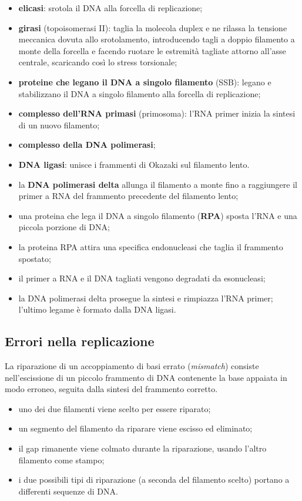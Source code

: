 \begin{itemize}
  \item \textbf{elicasi}: srotola il DNA alla forcella di replicazione;
  \item \textbf{girasi} (topoisomerasi II): taglia la molecola duplex e ne rilassa la tensione meccanica dovuta allo srotolamento, introducendo tagli a doppio filamento a monte della forcella e facendo ruotare le estremità tagliate attorno all'asse centrale, scaricando così lo stress torsionale;
  \item \textbf{proteine che legano il DNA a singolo filamento} (SSB): legano e stabilizzano il DNA a singolo filamento alla forcella di replicazione;
  \item \textbf{complesso dell'RNA primasi} (primosoma): l'RNA primer inizia la sintesi di un nuovo filamento;
  \item \textbf{complesso della DNA polimerasi};
  \item \textbf{DNA ligasi}: unisce i frammenti di Okazaki sul filamento lento.
\end{itemize}

\begin{itemize}
  \item la \textbf{DNA polimerasi delta} allunga il filamento a monte fino a raggiungere il primer a RNA del frammento precedente del filamento lento;
  \item una proteina che lega il DNA a singolo filamento (\textbf{RPA}) sposta l'RNA e una piccola porzione di DNA;
  \item la proteina RPA attira una specifica endonucleasi che taglia il frammento spostato;
  \item il primer a RNA e il DNA tagliati vengono degradati da esonucleasi;
  \item la DNA polimerasi delta prosegue la sintesi e rimpiazza l'RNA primer; l'ultimo legame è formato dalla DNA ligasi.
\end{itemize}

\subsection{Errori nella replicazione}

La riparazione di un accoppiamento di basi errato (\textit{mismatch}) consiste nell'escissione di un piccolo frammento di DNA contenente la base appaiata in modo erroneo, seguita dalla sintesi del frammento corretto.
\begin{itemize}
  \item uno dei due filamenti viene scelto per essere riparato;
  \item un segmento del filamento da riparare viene escisso ed eliminato;
  \item il gap rimanente viene colmato durante la riparazione, usando l'altro filamento come stampo;
  \item i due possibili tipi di riparazione (a seconda del filamento scelto) portano a differenti sequenze di DNA.
\end{itemize}
